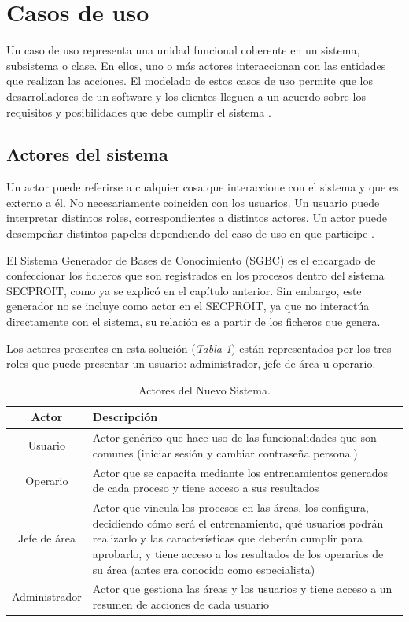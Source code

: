 
\section{Casos de uso}
Un caso de uso representa una unidad funcional coherente en un sistema, subsistema o clase. En ellos, uno o más actores interaccionan con las entidades que realizan las acciones. El modelado de estos casos de uso permite que los desarrolladores de un software y los clientes lleguen a un acuerdo sobre los requisitos y posibilidades que debe cumplir el sistema \cite{Kalaivani2004}.

\subsection{Actores del sistema} 
Un actor puede referirse a cualquier cosa que interaccione con el sistema y que es externo a él. No necesariamente coinciden con los usuarios. Un usuario puede interpretar distintos roles, correspondientes a distintos actores. Un actor puede desempeñar distintos papeles dependiendo del caso de uso en que participe \cite{Kalaivani2004}.

El Sistema Generador de Bases de Conocimiento (SGBC) es el encargado de confeccionar los ficheros que son registrados en los procesos dentro del sistema SECPROIT, como ya se explicó en el capítulo anterior. Sin embargo, este generador no se incluye como actor en el SECPROIT, ya que no interactúa directamente con el sistema, su relación es a partir de los ficheros que genera.

Los actores presentes en esta solución (\textsl{Tabla \ref{tab:actores}}) están representados por los tres roles que puede presentar un usuario: administrador, jefe de área u operario.

\begin{table}[H]
\begin{center}
\begin{tabular}{ | c | p{11cm} | }
\hline
\textbf{Actor} & \textbf{Descripción} \\
\hline
Usuario & Actor genérico que hace uso de las funcionalidades que son comunes (iniciar sesión y cambiar contraseña personal) \\
\hline
Operario & Actor que se capacita mediante los entrenamientos generados de cada proceso y tiene acceso a sus resultados \\
\hline
Jefe de área & Actor que vincula los procesos en las áreas, los configura, decidiendo cómo será el entrenamiento, qué usuarios podrán realizarlo y las características que deberán cumplir para aprobarlo, y tiene acceso a los resultados de los operarios de su área (antes era conocido como especialista) \\
\hline
Administrador & Actor que gestiona las áreas y los usuarios y tiene acceso a un resumen de acciones de cada usuario \\
\hline
\end{tabular}
\caption{Actores del Nuevo Sistema.}
\label{tab:actores}
\end{center}
\end{table}

